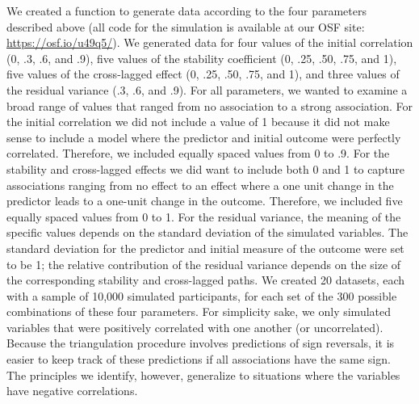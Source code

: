 \documentclass[
  man,mask,floatsintext]{apa6}
\begin{document}
We created a function to generate data according to the four parameters described above (all code for the simulation is available at our OSF site: \url{https://osf.io/u49q5/}). We generated data for four values of the initial correlation (0, .3, .6, and .9), five values of the stability coefficient (0, .25, .50, .75, and 1), five values of the cross-lagged effect (0, .25, .50, .75, and 1), and three values of the residual variance (.3, .6, and .9). For all parameters, we wanted to examine a broad range of values that ranged from no association to a strong association. For the initial correlation we did not include a value of 1 because it did not make sense to include a model where the predictor and initial outcome were perfectly correlated. Therefore, we included equally spaced values from 0 to .9. For the stability and cross-lagged effects we did want to include both 0 and 1 to capture associations ranging from no effect to an effect where a one unit change in the predictor leads to a one-unit change in the outcome. Therefore, we included five equally spaced values from 0 to 1. For the residual variance, the meaning of the specific values depends on the standard deviation of the simulated variables. The standard deviation for the predictor and initial measure of the outcome were set to be 1; the relative contribution of the residual variance depends on the size of the corresponding stability and cross-lagged paths. We created 20 datasets, each with a sample of 10,000 simulated participants, for each set of the 300 possible combinations of these four parameters. For simplicity sake, we only simulated variables that were positively correlated with one another (or uncorrelated). Because the triangulation procedure involves predictions of sign reversals, it is easier to keep track of these predictions if all associations have the same sign. The principles we identify, however, generalize to situations where the variables have negative correlations.
\end{document}
